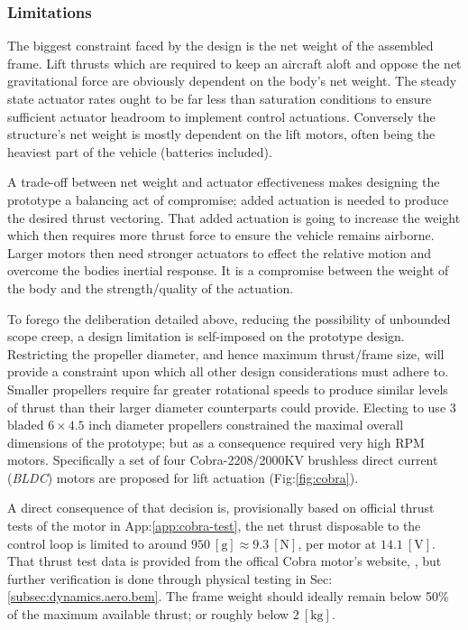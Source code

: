 \subsubsection{Limitations}
\label{subsubsec:intro.foreword.limits}
The biggest constraint faced by the design is the net weight of the assembled frame. Lift thrusts which are required to keep an aircraft aloft and oppose the net gravitational force are obviously dependent on the body's net weight. The steady state actuator rates ought to be far less than saturation conditions to ensure sufficient actuator headroom to implement control actuations. Conversely the structure's net weight is mostly dependent on the lift motors, often being the heaviest part of the vehicle (batteries included). 
\par
A trade-off between net weight and actuator effectiveness makes designing the prototype a balancing act of compromise; added actuation is needed to produce the desired thrust vectoring. That added actuation is going to increase the weight which then requires more thrust force to ensure the vehicle remains airborne. Larger motors then need stronger actuators to effect the relative motion and overcome the bodies inertial response. It is a compromise between the weight of the body and the strength/quality of the actuation.
\par
To forego the deliberation detailed above, reducing the possibility of unbounded scope creep, a design limitation is self-imposed on the prototype design. Restricting the propeller diameter, and hence maximum thrust/frame size, will provide a constraint upon which all other design considerations must adhere to. Smaller propellers require far greater rotational speeds to produce similar levels of thrust than their larger diameter counterparts could provide. Electing to use 3 bladed $6\times 4.5$ inch diameter propellers constrained the maximal overall dimensions of the prototype; but as a consequence required very high RPM motors. Specifically a set of four Cobra-2208/2000KV\cite{cobramotor} brushless direct current (\emph{BLDC}) motors are proposed for lift actuation (Fig:\ref{fig:cobra}). 
\par
A direct consequence of that decision is, provisionally based on official thrust tests of the motor in App:\ref{app:cobra-test}, the net thrust disposable to the control loop is limited to around $950~[\text{g}]\approx 9.3~[\text{N}]$, per motor at $14.1~[\text{V}]$. That thrust test data is provided from the offical Cobra motor's website, \cite{cobramotor}, but further verification is done through physical testing in Sec:\ref{subsec:dynamics.aero.bem}. The frame weight should ideally remain below 50\% of the maximum available thrust; or roughly below $2~[\text{kg}]$.
